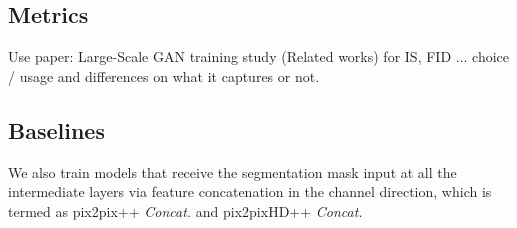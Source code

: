 





\subsection{Metrics}
Use paper: Large-Scale GAN training study (Related works) for IS, FID ... choice / usage and differences on what it captures or not.

\subsection{Baselines}
We also train models that receive the segmentation mask input at all the intermediate layers via feature
concatenation in the channel direction, which is termed as
pix2pix++ \textit{Concat.} and pix2pixHD++ \textit{Concat.}



   







